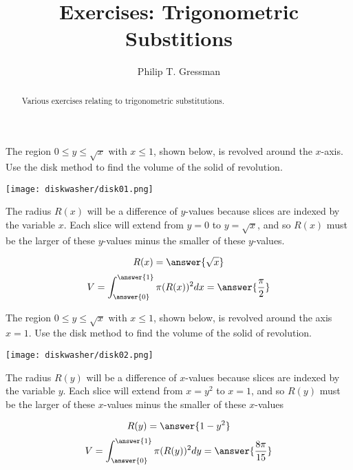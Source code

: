 \documentclass{ximera}
\title{Exercises: Trigonometric Substitions}
\author{Philip T. Gressman}
\begin{document}
\begin{abstract}
Various exercises relating to trigonometric substitutions.
\end{abstract}
\maketitle

\begin{exercise}
The region $0 \leq y \leq \sqrt{x}$ with $x \leq 1$, shown below, is revolved around the $x$-axis. Use the disk method to find the volume of the solid of revolution.
\begin{center}
\begin{image}
\texttt{[image: diskwasher/disk01.png]}
\end{image}
\end{center}
\begin{hint}
The radius $R(x)$ will be a difference of $y$-values because slices are indexed by the variable $x$.
Each slice will extend from $y=0$ to $y =  \sqrt{x}$, and so $R(x)$ must be the larger of these $y$-values minus the smaller of these $y$-values.
\end{hint}
\begin{prompt}
\[ R(x) = \answer{\sqrt{x}} \]
\[ V = \int_{\answer{0}}^{\answer{1}} \pi (R(x))^2 dx =  \answer{\frac{\pi}{2}} \]
\end{prompt}
\end{exercise}


\begin{exercise}
The region $0 \leq y \leq \sqrt{x}$ with $x \leq 1$, shown below, is revolved around the axis $x=1$. Use the disk method to find the volume of the solid of revolution.
\begin{center}
\begin{image}
\texttt{[image: diskwasher/disk02.png]}
\end{image}
\end{center}
\begin{hint}
The radius $R(y)$ will be a difference of $x$-values because slices are indexed by the variable $y$.
Each slice will extend from $x = y^2$ to $x = 1$, and so $R(y)$ must be the larger of these $x$-values minus the smaller of these $x$-values
\end{hint}
\begin{prompt}
\[ R(y) = \answer{1 - y^2} \]
\[ V = \int_{\answer{0}}^{\answer{1}} \pi (R(y))^2 dy = \answer{\frac{8\pi}{15}} \]
\end{prompt}
\end{exercise}
\end{document}
